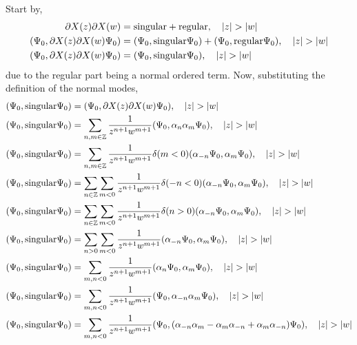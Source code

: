 \probitem{}

Start by,
\begin{align*}
    \partial X\qty(z)\partial X\qty(w)&=\textnormal{singular}+\textnormal{regular},\ \ \ \abs{z}>\abs{w}\\
    \qty(\Psi_0,\partial X\qty(z)\partial X\qty(w)\Psi_0)&=\qty(\Psi_0,\textnormal{singular}\Psi_0)+\qty(\Psi_0,\textnormal{regular}\Psi_0),\ \ \ \abs{z}>\abs{w}\\
    \qty(\Psi_0,\partial X\qty(z)\partial X\qty(w)\Psi_0)&=\qty(\Psi_0,\textnormal{singular}\Psi_0),\ \ \ \abs{z}>\abs{w}
\end{align*}
due to the regular part being a normal ordered term. Now, substituting the definition of the normal modes,
\begin{align*}
    \qty(\Psi_0,\textnormal{singular}\Psi_0)&=\qty(\Psi_0,\partial X\qty(z)\partial X\qty(w)\Psi_0),\ \ \ \abs{z}>\abs{w}\\
    \qty(\Psi_0,\textnormal{singular}\Psi_0)&=\sum\limits_{n,m\in\mathbb Z}\frac{1}{z^{n+1}w^{m+1}}\qty(\Psi_0,\alpha_n\alpha_m\Psi_0),\ \ \ \abs{z}>\abs{w}\\
    \qty(\Psi_0,\textnormal{singular}\Psi_0)&=\sum\limits_{n,m\in\mathbb Z}\frac{1}{z^{n+1}w^{m+1}}\delta\qty(m<0)\qty(\alpha_{-n}\Psi_0,\alpha_m\Psi_0),\ \ \ \abs{z}>\abs{w}\\
    \qty(\Psi_0,\textnormal{singular}\Psi_0)&=\sum\limits_{n\in\mathbb Z}\sum\limits_{m<0}\frac{1}{z^{n+1}w^{m+1}}\delta\qty(-n<0)\qty(\alpha_{-n}\Psi_0,\alpha_m\Psi_0),\ \ \ \abs{z}>\abs{w}\\
    \qty(\Psi_0,\textnormal{singular}\Psi_0)&=\sum\limits_{n\in\mathbb Z}\sum\limits_{m<0}\frac{1}{z^{n+1}w^{m+1}}\delta\qty(n>0)\qty(\alpha_{-n}\Psi_0,\alpha_m\Psi_0),\ \ \ \abs{z}>\abs{w}\\
    \qty(\Psi_0,\textnormal{singular}\Psi_0)&=\sum\limits_{n>0}\sum\limits_{m<0}\frac{1}{z^{n+1}w^{m+1}}\qty(\alpha_{-n}\Psi_0,\alpha_m\Psi_0),\ \ \ \abs{z}>\abs{w}\\
    \qty(\Psi_0,\textnormal{singular}\Psi_0)&=\sum\limits_{m,n<0}\frac{1}{z^{n+1}w^{m+1}}\qty(\alpha_{n}\Psi_0,\alpha_m\Psi_0),\ \ \ \abs{z}>\abs{w}\\
    \qty(\Psi_0,\textnormal{singular}\Psi_0)&=\sum\limits_{m,n<0}\frac{1}{z^{n+1}w^{m+1}}\qty(\Psi_0,\alpha_{-n}\alpha_m\Psi_0),\ \ \ \abs{z}>\abs{w}\\
    \qty(\Psi_0,\textnormal{singular}\Psi_0)&=\sum\limits_{m,n<0}\frac{1}{z^{n+1}w^{m+1}}\qty(\Psi_0,\qty(\alpha_{-n}\alpha_m-\alpha_m\alpha_{-n}+\alpha_m\alpha_{-n})\Psi_0),\ \ \ \abs{z}>\abs{w}\\

\end{align*}
